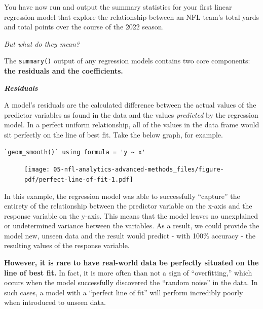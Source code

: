 \documentclass[
  letterpaper,
]{krantz}
\begin{document}
\begin{tcolorbox}[enhanced jigsaw, colback=white, leftrule=.75mm, breakable, colframe=quarto-callout-important-color-frame, bottomtitle=1mm, rightrule=.15mm, left=2mm, opacityback=0, bottomrule=.15mm, arc=.35mm, coltitle=black, colbacktitle=quarto-callout-important-color!10!white, toptitle=1mm, titlerule=0mm, title=\textcolor{quarto-callout-important-color}{\faExclamation}\hspace{0.5em}{Reading \& Understanding Regression Results}, toprule=.15mm, opacitybacktitle=0.6]

You have now run and output the summary statistics for your first linear
regression model that explore the relationship between an NFL team's
total yards and total points over the course of the 2022 season.

\emph{But what do they mean?}

The \texttt{summary()} output of any regression models contains two core
components: \textbf{the residuals and the coefficients.}

\textbf{\emph{Residuals}}

A model's residuals are the calculated difference between the actual
values of the predictor variables as found in the data and the values
\emph{predicted} by the regression model. In a perfect uniform
relationship, all of the values in the data frame would sit perfectly on
the line of best fit. Take the below graph, for example.

\begin{verbatim}
`geom_smooth()` using formula = 'y ~ x'
\end{verbatim}

\begin{figure}[H]

{\centering \texttt{[image: 05-nfl-analytics-advanced-methods\_files/figure-pdf/perfect-line-of-fit-1.pdf]}

}

\end{figure}

In this example, the regression model was able to successfully
``capture'' the entirety of the relationship between the predictor
variable on the x-axis and the response variable on the y-axis. This
means that the model leaves no unexplained or undetermined variance
between the variables. As a result, we could provide the model new,
unseen data and the result would predict - with 100\% accuracy - the
resulting values of the response variable.

\textbf{However, it is rare to have real-world data be perfectly
situated on the line of best fit.} In fact, it is more often than not a
sign of ``overfitting,'' which occurs when the model successfully
discovered the ``random noise'' in the data. In such cases, a model with
a ``perfect line of fit'' will perform incredibly poorly when introduced
to unseen data.


\end{tcolorbox}
\end{document}
